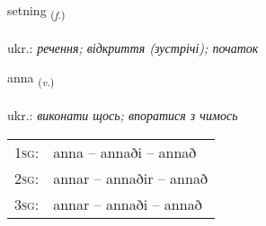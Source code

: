 \documentclass[frontgrid, backgrid]{flacards}\usepackage[]{graphicx}\usepackage[]{xcolor}
\begin{document}
\renewcommand{\flhead}{\vskip5pt \fboxsep=0pt {\small\bfseries\footnotesize Nafnorð | іменник}}
\renewcommand{\fcfoot}{\vskip5pt \fboxsep=0pt \hspace{2pt}{\small\bfseries\footnotesize 2K}}

\renewcommand{\blhead}{\vskip5pt {\small\bfseries\footnotesize Nafnorð | іменник }}
\renewcommand{\bcfoot}{\vskip5pt \hspace{2pt}{\small\bfseries\footnotesize 2K}}


{setning \small{\textsubscript{(\textit{f.})}} \\[1ex] %
\textphonetic{[sɛhtniŋk]} \\
ukr.: \emph{речення; відкриття (зустрічі); початок} \\  [2ex]
\renewcommand*{\arraystretch}{0.8}
}

\renewcommand{\flhead}{\vskip5pt \fboxsep=0pt {\small\bfseries\footnotesize Sagnorð | дієслово}}
\renewcommand{\fcfoot}{\vskip5pt \fboxsep=0pt \hspace{2pt}{\small\bfseries\footnotesize 2K}}

\renewcommand{\blhead}{\vskip5pt {\small\bfseries\footnotesize Sagnorð | дієслово }}
\renewcommand{\bcfoot}{\vskip5pt \hspace{2pt}{\small\bfseries\footnotesize 2K}}


{anna \small{\textsubscript{(\textit{v.})}} \\[1ex] %
\textphonetic{[ana]} \\
ukr.: \emph{виконати щось; впоратися з чимось} \\  [2ex]
\renewcommand*{\arraystretch}{0.8}
\begin{tabular}{p{1cm}l}
\textsc{1sg}: & anna -- annaði -- annað \\ 
\textsc{2sg}: & annar -- annaðir -- annað \\ 
\textsc{3sg}: & annar -- annaði -- annað \\ 
\end{tabular}
}
\end{document}
